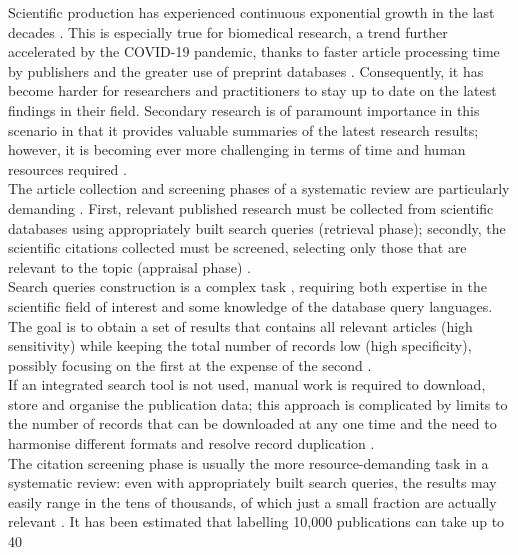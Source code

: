 \documentclass[]{bmcart}
\begin{document}
Scientific production has experienced continuous exponential growth in
the last decades \citep{larsen2010rate, bornmann2015growth}. This is
especially true for biomedical research, a trend further accelerated by
the COVID-19 pandemic, thanks to faster article processing time by
publishers and the greater use of preprint databases
\citep{aviv2021publication, horbach2020pandemic, hoy2020rise}.
Consequently, it has become harder for researchers and practitioners to
stay up to date on the latest findings in their field. Secondary
research is of paramount importance in this scenario in that it provides
valuable summaries of the latest research results; however, it is
becoming ever more challenging in terms of time and human resources
required
\citep{allen1999estimating, borah2017analysis, cohen2010evidence, bastian2010seventy}.\\
The article collection and screening phases of a systematic review are
particularly demanding \citep{babar2009systematic}. First, relevant
published research must be collected from scientific databases using
appropriately built search queries (retrieval phase); secondly, the
scientific citations collected must be screened, selecting only those
that are relevant to the topic (appraisal phase)
\citep{bannach2019machine, tsafnat2014systematic, higgins2019cochrane}.\\
Search queries construction is a complex task
\citep{lefebvre2011searching, hammerstrom2010searching}, requiring both
expertise in the scientific field of interest and some knowledge of the
database query languages. The goal is to obtain a set of results that
contains all relevant articles (high sensitivity) while keeping the
total number of records low (high specificity), possibly focusing on the
first at the expense of the second \citep{hammerstrom2010searching}.\\
If an integrated search tool is not used, manual work is required to
download, store and organise the publication data; this approach is
complicated by limits to the number of records that can be downloaded at
any one time and the need to harmonise different formats and resolve
record duplication \citep{marshall2015systematic}.\\
The citation screening phase is usually the more resource-demanding task
in a systematic review: even with appropriately built search queries,
the results may easily range in the tens of thousands, of which just a
small fraction are actually relevant \citep{lefebvre2011searching}. It
has been estimated that labelling 10,000 publications can take up to 40
\end{document}
